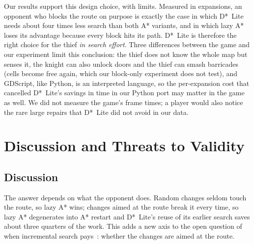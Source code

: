 \documentclass[conference,12pt]{IEEEtran}
\newcommand{\dstar}{D*~Lite}
\begin{document}
Our results support this design choice, with limits. Measured in expansions, an opponent who
blocks the route on purpose is exactly the case in which \dstar{} needs about four times less
search than both A* variants, and in which lazy A* loses its advantage because every block hits
its path. \dstar{} is therefore the right choice for the thief \emph{in search effort}. Three
differences between the game and our experiment limit this conclusion: the thief does not know
the whole map but senses it, the knight can also unlock doors and the thief can smash barricades
(cells become free again, which our block-only experiment does not test), and GDScript, like
Python, is an interpreted language, so the per-expansion cost that cancelled \dstar{}'s savings in
time in our Python port may matter in the game as well. We did not measure the game's frame
times; a player would also notice the rare large repairs that \dstar{} did not avoid in our data.

\section{Discussion and Threats to Validity}
\label{sec:discussion}

\subsection{Discussion}
The answer depends on what the opponent does. Random changes seldom touch the route, so lazy A*
wins; changes aimed at the route break it every time, so lazy A* degenerates into A* restart and
\dstar{}'s reuse of its earlier search saves about three quarters of the work. This adds a new
axis to the open question of when incremental search
pays~\cite{hernandez2012poorly,hernandez2014mpaa}: whether the changes are aimed at the route.
\end{document}
